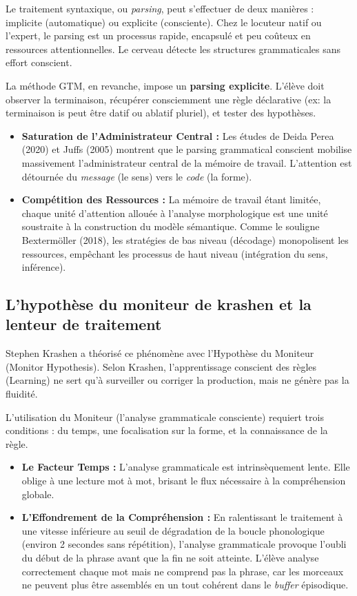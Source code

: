 Le traitement syntaxique, ou \textit{parsing}, peut s'effectuer de deux manières : implicite
(automatique) ou explicite (consciente). Chez le locuteur natif ou l'expert, le parsing est un
processus rapide, encapsulé et peu coûteux en ressources attentionnelles. Le cerveau détecte les
structures grammaticales sans effort conscient.\cite{II-1-3-ref8}

La méthode GTM, en revanche, impose un \textbf{parsing explicite}. L'élève doit observer la
terminaison, récupérer consciemment une règle déclarative (ex: \og la terminaison \-is peut être
datif ou ablatif pluriel\fg{}), et tester des hypothèses.

\begin{itemize}\item \textbf{Saturation de l'Administrateur Central :} Les études de Deida Perea (2020) et Juffs (2005) montrent que le parsing grammatical conscient mobilise massivement l'administrateur central de la mémoire de travail.\cite{II-1-3-ref10} L'attention est détournée du \textit{message} (le sens) vers le \textit{code} (la forme).\item \textbf{Compétition des Ressources :} La mémoire de travail étant limitée, chaque unité d'attention allouée à l'analyse morphologique est une unité soustraite à la construction du modèle sémantique. Comme le souligne Bextermöller (2018), les stratégies de bas niveau (décodage) monopolisent les ressources, empêchant les processus de haut niveau (intégration du sens, inférence).\cite{II-1-3-ref11}\end{itemize}

\subsection{L'hypothèse du moniteur de krashen et la lenteur de traitement}

Stephen Krashen a théorisé ce phénomène avec l'Hypothèse du Moniteur (Monitor Hypothesis). Selon
Krashen, l'apprentissage conscient des règles (Learning) ne sert qu'à \og surveiller\fg{} ou
corriger la production, mais ne génère pas la fluidité.\cite{II-1-3-ref13}

L'utilisation du \og Moniteur\fg{} (l'analyse grammaticale consciente) requiert trois conditions :
du temps, une focalisation sur la forme, et la connaissance de la règle.

\begin{itemize}\item \textbf{Le Facteur Temps :} L'analyse grammaticale est intrinsèquement lente. Elle oblige à une lecture mot à mot, brisant le flux nécessaire à la compréhension globale.\item \textbf{L'Effondrement de la Compréhension :} En ralentissant le traitement à une vitesse inférieure au seuil de dégradation de la boucle phonologique (environ 2 secondes sans répétition), l'analyse grammaticale provoque l'oubli du début de la phrase avant que la fin ne soit atteinte.\cite{II-1-3-ref2} L'élève \og analyse\fg{} correctement chaque mot mais ne comprend pas la phrase, car les morceaux ne peuvent plus être assemblés en un tout cohérent dans le \textit{buffer} épisodique.\end{itemize}

